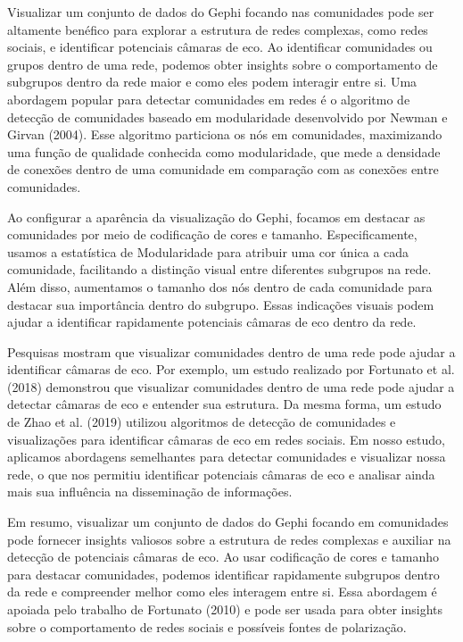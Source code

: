Visualizar um conjunto de dados do Gephi focando nas comunidades pode ser altamente benéfico para explorar a estrutura de redes complexas, como redes sociais, e identificar potenciais câmaras de eco. Ao identificar comunidades ou grupos dentro de uma rede, podemos obter insights sobre o comportamento de subgrupos dentro da rede maior e como eles podem interagir entre si. Uma abordagem popular para detectar comunidades em redes é o algoritmo de detecção de comunidades baseado em modularidade desenvolvido por Newman e Girvan (2004). Esse algoritmo particiona os nós em comunidades, maximizando uma função de qualidade conhecida como modularidade, que mede a densidade de conexões dentro de uma comunidade em comparação com as conexões entre comunidades.

Ao configurar a aparência da visualização do Gephi, focamos em destacar as comunidades por meio de codificação de cores e tamanho. Especificamente, usamos a estatística de Modularidade para atribuir uma cor única a cada comunidade, facilitando a distinção visual entre diferentes subgrupos na rede. Além disso, aumentamos o tamanho dos nós dentro de cada comunidade para destacar sua importância dentro do subgrupo. Essas indicações visuais podem ajudar a identificar rapidamente potenciais câmaras de eco dentro da rede.

Pesquisas mostram que visualizar comunidades dentro de uma rede pode ajudar a identificar câmaras de eco. Por exemplo, um estudo realizado por Fortunato et al. (2018) demonstrou que visualizar comunidades dentro de uma rede pode ajudar a detectar câmaras de eco e entender sua estrutura. Da mesma forma, um estudo de Zhao et al. (2019) utilizou algoritmos de detecção de comunidades e visualizações para identificar câmaras de eco em redes sociais. Em nosso estudo, aplicamos abordagens semelhantes para detectar comunidades e visualizar nossa rede, o que nos permitiu identificar potenciais câmaras de eco e analisar ainda mais sua influência na disseminação de informações.

Em resumo, visualizar um conjunto de dados do Gephi focando em comunidades pode fornecer insights valiosos sobre a estrutura de redes complexas e auxiliar na detecção de potenciais câmaras de eco. Ao usar codificação de cores e tamanho para destacar comunidades, podemos identificar rapidamente subgrupos dentro da rede e compreender melhor como eles interagem entre si. Essa abordagem é apoiada pelo trabalho de Fortunato (2010) e pode ser usada para obter insights sobre o comportamento de redes sociais e possíveis fontes de polarização.

